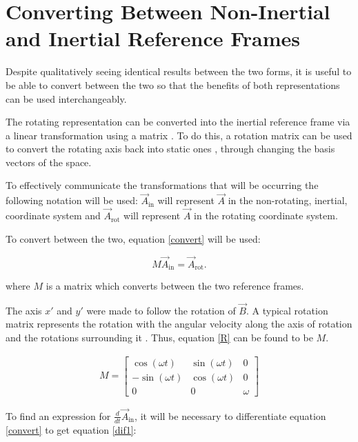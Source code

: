 \documentclass[pstricks, border=12pt]{article}
\begin{document}
\section{Converting Between Non-Inertial and Inertial Reference Frames}
Despite qualitatively seeing identical results between the two forms, it is useful to be able to convert between the two so that the benefits of both representations can be used interchangeably.

The rotating representation can be converted into the inertial reference frame via a linear transformation using a matrix \cite{fitzpatrick}. To do this, a rotation matrix can be used to convert the rotating axis back into static ones \cite{kundu_tritton}, through changing the basis vectors of the space.

To effectively communicate the transformations that will be occurring the following notation will be used: $\Vec{A}_{\text{in}}$ will represent $\vec A$ in the non-rotating, inertial, coordinate system and $\Vec{A}_{\text{rot}}$ will  represent $\vec A$ in the rotating coordinate system.
 
    To convert between the two, equation \eqref{convert} will be used:

\begin{equation}
     M\Vec{A}_{\text{in}} = \Vec{A}_{\text{rot}}.
    \label{convert}
\end{equation}

where $M$ is a matrix which converts between the two reference frames.

The axis $x'$ and $y'$ were made to follow the rotation of $\vec B$. A typical rotation matrix represents the rotation with the angular velocity along the axis of rotation and the rotations surrounding it \cite{kundu_tritton}. Thus, equation \eqref{R} can be found to be $M$.

\begin{equation}
    \begin{split}
        M =
        \begin{bmatrix}
            \cos(\omega t) &\sin(\omega t) &0\\
            -\sin(\omega t) &\cos(\omega t) &0\\
            0 &0 &\omega
        \end{bmatrix}
    \end{split}
    \label{R}
\end{equation}

To find an expression for $\frac{d}{dt}\Vec{A}_{\text{in}}$, it will be necessary to differentiate equation \ref{convert} to get equation \ref{dif1}:
\end{document}
